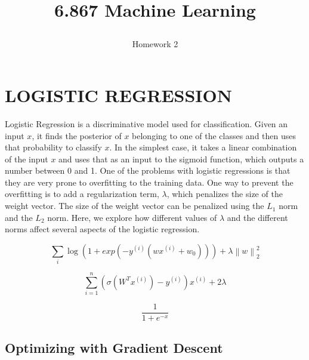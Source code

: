 \documentclass[10pt,twoside]{article}
\begin{document}
\title{6.867 Machine Learning  \subtitle{Homework 2} }

\maketitle


\section{\uppercase{Logistic Regression}}

\noindent Logistic Regression is a discriminative model used for classification. Given an input $x$, it finds the posterior of $x$ belonging to one of the classes and then uses that probability to classify $x$. In the simplest case, it takes a linear combination of the input $x$ and uses that as an input to the sigmoid function, which outputs a number between 0 and 1. One of the problems with logistic regressions is that they are very prone to overfitting to the training data. One way to prevent the overfitting is to add a regularization term, $\lambda$, which penalizes the size of the weight vector. The size of the weight vector can be penalized using the $L_1$ norm and the $L_2$ norm. Here, we explore how different values of $\lambda$  and the different norms affect several aspects of the logistic regression.

\begin{equation}
\sum_i \log(1+exp(-y^{(i)}(wx^{(i)}+w_0))) + \lambda \left \| w \right \|_2^2
\end{equation}

\begin{equation}
\sum_{i=1}^n (\sigma (W^Tx^{(i)})-y^{(i)})x^{(i)} + 2\lambda 
\end{equation}


\begin{equation}
\frac{1}{1+e^{-x}}
\end{equation}


\subsection{Optimizing with Gradient Descent}
\end{document}
